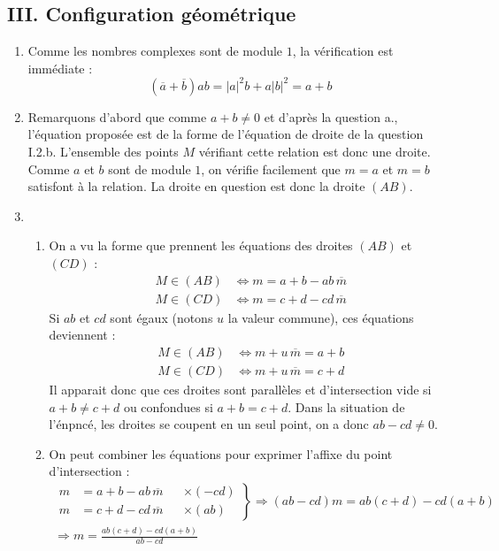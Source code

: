 \subsection*{III. Configuration géométrique}
\begin{enumerate}
 \item Comme les nombres complexes sont de module $1$, la vérification est immédiate :
\begin{displaymath}
 (\overline{a}+\overline{b})ab = |a|^2b+a|b|^2 = a+b
\end{displaymath}

 \item Remarquons d'abord que comme $a+b\neq0$ et d'après la question a., l'équation proposée est de la forme de l'équation de droite de la question I.2.b. L'ensemble des points $M$ vérifiant cette relation est donc une droite. Comme $a$ et $b$ sont de module $1$, on vérifie facilement que $m=a$ et $m=b$ satisfont à la relation. La droite en question est donc la droite $(AB)$.
 \item
\begin{enumerate}
 \item On a vu la forme que prennent les équations des droites $(AB)$ et $(CD)$ :
\begin{align*}
 M\in (AB) &\Leftrightarrow m =a +b-ab\,\overline{m} \\
 M\in (CD) &\Leftrightarrow m =c +d-cd\,\overline{m} 
\end{align*}
Si $ab$ et $cd$ sont égaux (notons $u$ la valeur commune), ces équations deviennent :
\begin{align*}
 M\in (AB) &\Leftrightarrow m + u\,\overline{m} = a +b \\
 M\in (CD) &\Leftrightarrow m + u\,\overline{m} = c +d 
\end{align*}
Il apparait donc que ces droites sont parallèles et d'intersection vide si $a+b\neq c+d$ ou confondues si $a+b=c+d$. Dans la situation de l'énpncé, les droites se coupent en un seul point, on a donc $ab-cd\neq 0$.
 \item On peut combiner les équations pour exprimer l'affixe du point d'intersection :
\begin{multline*}
 \left. 
\begin{aligned}
 m &= a + b - ab\,\overline{m} & &\times(-cd)\\
 m &= c + d - cd\,\overline{m} & &\times(ab)
\end{aligned}
\right\rbrace
\Rightarrow
 (ab-cd)m = ab(c+d)-cd(a+b) \\
\Rightarrow
 m = \frac{ab(c+d)-cd(a+b)}{ab-cd}
\end{multline*}


\end{enumerate}
\end{enumerate}
